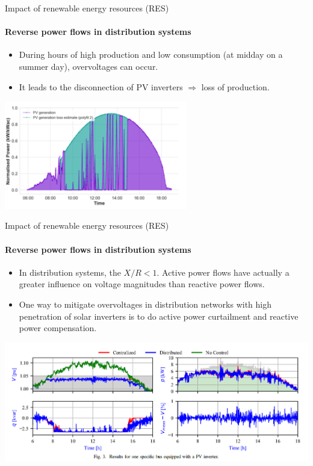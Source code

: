 \begin{frame}
{Impact of renewable energy resources (RES)}
\framesubtitle{Reverse power flows in distribution systems}
\begin{itemize}
    \item During hours of high production and low consumption (at midday on a summer day), overvoltages can occur.
    \item It leads to the disconnection of PV inverters $\Rightarrow$ loss of production.
\end{itemize}
\begin{center}
\includegraphics[width=0.6\textwidth]{images/PVdisconnection.png}
\end{center}
\end{frame}

\begin{frame}
{Impact of renewable energy resources (RES)}
\framesubtitle{Reverse power flows in distribution systems}
\begin{itemize}
    \item In distribution systems, the $X/R < 1$. Active power flows have actually a greater influence on voltage magnitudes than reactive power flows.
    \item One way to mitigate overvoltages in distribution networks with high penetration of solar inverters is to do active power curtailment and reactive power compensation.
\end{itemize}
\begin{center}
\includegraphics[width=\textwidth]{images/VoltageCtrl.png}
\end{center}
\end{frame}

